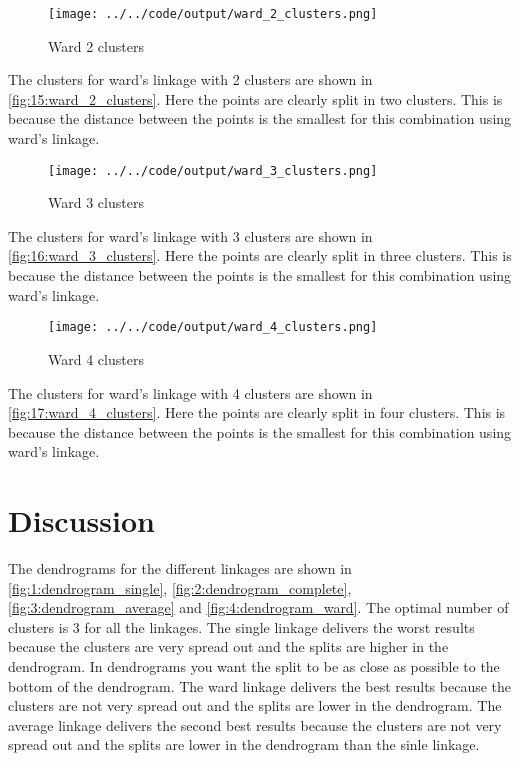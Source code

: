 \documentclass[twoside, a4paper, fleqn, reqno]{article}
\begin{document}
\begin{figure}[H]
	\centering
	\texttt{[image: ../../code/output/ward\_2\_clusters.png]}
	\caption{Ward 2 clusters}
	\label{fig:15:ward_2_clusters}
\end{figure}

The clusters for ward's linkage with 2 clusters are shown in \autoref{fig:15:ward_2_clusters}.
Here the points are clearly split in two clusters.
This is because the distance between the points is the smallest for this combination using ward's linkage.

\begin{figure}[H]
	\centering
	\texttt{[image: ../../code/output/ward\_3\_clusters.png]}
	\caption{Ward 3 clusters}
	\label{fig:16:ward_3_clusters}
\end{figure}

The clusters for ward's linkage with 3 clusters are shown in \autoref{fig:16:ward_3_clusters}.
Here the points are clearly split in three clusters.
This is because the distance between the points is the smallest for this combination using ward's linkage.

\begin{figure}[H]
	\centering
	\texttt{[image: ../../code/output/ward\_4\_clusters.png]}
	\caption{Ward 4 clusters}
	\label{fig:17:ward_4_clusters}
\end{figure}

The clusters for ward's linkage with 4 clusters are shown in \autoref{fig:17:ward_4_clusters}.
Here the points are clearly split in four clusters.
This is because the distance between the points is the smallest for this combination using ward's linkage.

\section{Discussion}

The dendrograms for the different linkages are shown in \autoref{fig:1:dendrogram_single}, \autoref{fig:2:dendrogram_complete}, \autoref{fig:3:dendrogram_average} and \autoref{fig:4:dendrogram_ward}.
The optimal number of clusters is 3 for all the linkages.
The single linkage delivers the worst results because the clusters are very spread out and the splits are higher in the dendrogram.
In dendrograms you want the split to be as close as possible to the bottom of the dendrogram.
The ward linkage delivers the best results because the clusters are not very spread out and the splits are lower in the dendrogram.
The average linkage delivers the second best results because the clusters are not very spread out and the splits are lower in the dendrogram than the sinle linkage.
\end{document}

